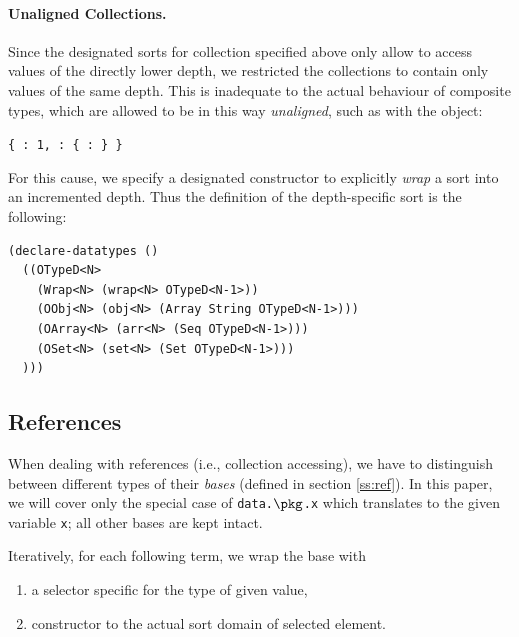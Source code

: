 \paragraph{Unaligned Collections.}
Since the designated sorts for collection specified above only allow to access values of the directly lower depth, we restricted the collections to contain only values of the same depth.
This is inadequate to the actual behaviour of composite types, which are allowed to be in this way \emph{unaligned}, such as with the object:
\begin{center}
  \texttt{\{ : 1, : \{ :  \} \}}
\end{center}
For this cause, we specify a designated constructor to explicitly \emph{wrap} a sort into an incremented depth.
Thus the definition of the depth-specific sort is the following:
\begin{lstlisting}[language=SMT]
(declare-datatypes ()
  ((OTypeD<N>
    (Wrap<N> (wrap<N> OTypeD<N-1>))
    (OObj<N> (obj<N> (Array String OTypeD<N-1>)))
    (OArray<N> (arr<N> (Seq OTypeD<N-1>)))
    (OSet<N> (set<N> (Set OTypeD<N-1>)))
  )))
\end{lstlisting}


\subsection{References}

When dealing with references (i.e., collection accessing), we have to distinguish between different types of their \emph{bases} (defined in section \ref{ss:ref}).
In this paper, we will cover only the special case of \texttt{data.$\pkg$.x} which translates to the given variable \texttt{x}; all other bases are kept intact.

Iteratively, for each following term, we wrap the base with
\begin{enumerate}
  \item a selector specific for the type of given value,
  \item constructor to the actual sort domain of selected element.
\end{enumerate}

